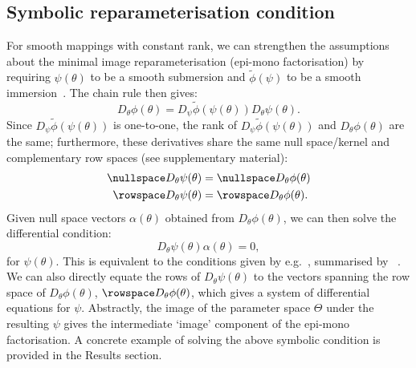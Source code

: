 \subsection{Symbolic reparameterisation condition}
For smooth mappings with constant rank, we can strengthen the assumptions about the minimal image reparameterisation (epi-mono factorisation) by requiring $\psi(\theta)$ to be a smooth submersion and $\tilde{\phi}(\psi)$ to be a smooth immersion~\cite{Lee2013}. The chain rule then gives:
\begin{equation}
D_\theta\phi(\theta) = D_\psi\tilde{\phi}(\psi(\theta))D_\theta\psi(\theta).
\end{equation}
Since $D_\psi\tilde{\phi}(\psi(\theta))$ is one-to-one, the rank of $D_\psi\tilde{\phi}(\psi(\theta))$ and $D_\theta\phi(\theta)$ are the same; furthermore, these derivatives share the same null space/kernel and complementary row spaces (see supplementary material):
\begin{equation}
\begin{aligned}
\nullspace D_\theta\psi(\theta) &= \nullspace D_\theta\phi(\theta)\\
\rowspace D_\theta\psi(\theta) &= \rowspace D_\theta\phi(\theta).
\end{aligned}
\end{equation}
Given null space vectors $\alpha(\theta)$ obtained from $D_\theta\phi(\theta)$, we can then solve the differential condition:
\begin{equation}
D_\theta\psi(\theta)\alpha(\theta) = 0,
\end{equation}
for $\psi(\theta)$. This is equivalent to the conditions given by e.g.~\cite{Catchpole1997,Catchpole1998}, summarised by ~\cite{Cole2010, Cole2020}. We can also directly equate the rows of $D_\theta\psi(\theta)$ to the vectors spanning the row space of $D_\theta\phi(\theta)$, $\rowspace D_\theta\phi(\theta)$, which gives a system of differential equations for $\psi$. Abstractly, the image of the parameter space $\Theta$ under the resulting $\psi$ gives the intermediate `image' component of the epi-mono factorisation. A concrete example of solving the above symbolic condition is provided in the Results section.

